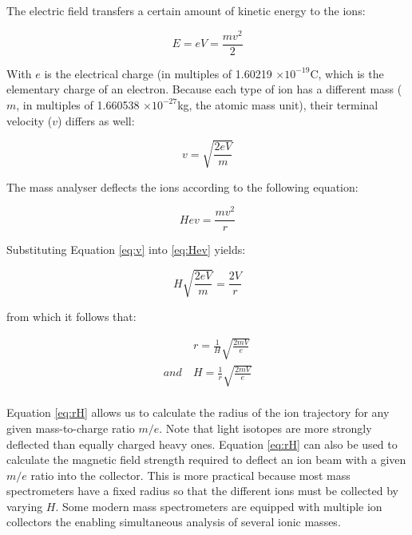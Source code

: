 \documentclass{book}
\begin{document}
The electric field transfers a certain amount of kinetic energy to the
ions:

\begin{equation}
E = e V = \frac{m v^2}{2}
\label{eq:E}
\end{equation}

With $e$ is the electrical charge (in multiples of 1.60219 $\times
10^{-19}$C, which is the elementary charge of an electron.  Because
each type of ion has a different mass ($m$, in multiples of 1.660538
$\times 10^{-27}$kg, the atomic mass unit), their terminal velocity
($v$) differs as well:

\begin{equation}
v = \sqrt{\frac{2 e V}{m}}
\label{eq:v}
\end{equation}

The mass analyser deflects the ions according to the following equation:

\begin{equation}
H e v = \frac{m v^2}{r}
\label{eq:Hev}
\end{equation}

Substituting Equation \ref{eq:v} into \ref{eq:Hev} yields:

\begin{equation}
H \sqrt{\frac{2 e V}{m}} = \frac{2 V}{r}
\label{eq:H2eVm}
\end{equation}

from which it follows that:

\begin{equation}
\begin{array}{rl}
~ & r = \frac{1}{H}\sqrt{\frac{2 m V}{e}} \\
and~ & H = \frac{1}{r}\sqrt{\frac{2 m V}{e}}\\
\end{array}
\label{eq:rH}
\end{equation}

Equation \ref{eq:rH} allows us to calculate the radius of the ion
trajectory for any given mass-to-charge ratio $m/e$. Note that light
isotopes are more strongly deflected than equally charged heavy ones.
Equation \ref{eq:rH} can also be used to calculate the magnetic field
strength required to deflect an ion beam with a given $m/e$ ratio into
the collector.  This is more practical because most mass spectrometers
have a fixed radius so that the different ions must be collected by
varying $H$. Some modern mass spectrometers are equipped with multiple
ion collectors the enabling simultaneous analysis of several ionic
masses.
\end{document}
